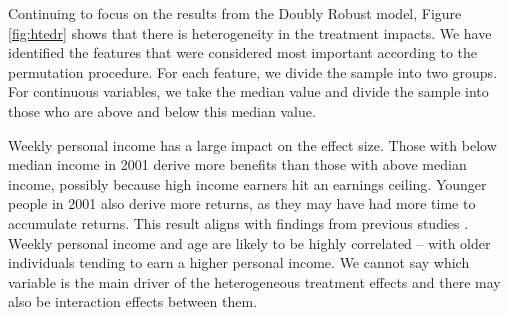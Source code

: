 \documentclass[12pt, a4paper]{article}
\begin{document}

Continuing to focus on the results from the Doubly Robust model, Figure
\ref{fig:htedr} shows that there is heterogeneity in the treatment impacts. We
have identified the features that were considered most important according to
the permutation procedure. For each feature, we divide the sample into two
groups. For continuous variables, we take the median value and divide the
sample into those who are above and below this median value. 

Weekly personal income has a large impact on the effect size. Those with below
median income in 2001 derive more benefits than those with above median income,
possibly because high income earners hit an earnings ceiling. Younger people in
2001 also derive more returns, as they may have had more time to accumulate
returns. This result aligns with findings from previous studies
\citep{polidano2016,dorsett2016,perales2017}. Weekly personal income and age
are likely to be highly correlated -- with older individuals tending to earn a
higher personal income. We cannot say which variable is the main driver of the
heterogeneous treatment effects and there may also be interaction effects between them.
\end{document}
